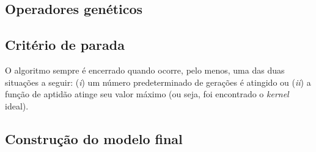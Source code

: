 \subsection{Operadores genéticos}
\lipsum[1-3]

\subsection{Critério de parada}
O algoritmo sempre é encerrado quando ocorre, pelo menos, uma das duas situações a seguir: (\textit{i}) um número predeterminado de gerações é atingido ou (\textit{ii}) a função de aptidão atinge seu valor máximo (ou seja, foi encontrado o \textit{kernel} ideal).

\subsection{Construção do modelo final}
\lipsum[1-2]